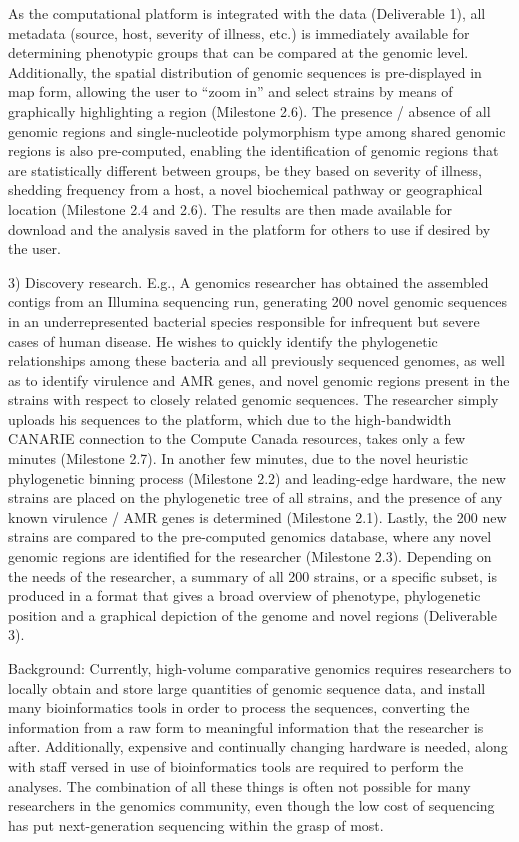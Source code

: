 \documentclass[letterpaper,12pt]{report}
\begin{document}
As the computational platform is integrated with the data (Deliverable 1), all metadata (source, host, severity of illness, etc.) is immediately available for determining phenotypic groups that can be compared at the genomic level. Additionally, the spatial distribution of genomic sequences is pre-displayed in map form, allowing the user to “zoom in” and select strains by means of graphically highlighting a region (Milestone 2.6). The presence / absence of all genomic regions and single-nucleotide polymorphism type among shared genomic regions is also pre-computed, enabling the identification of genomic regions that are statistically different between groups, be they based on severity of illness, shedding frequency from a host, a novel biochemical pathway or geographical location (Milestone 2.4 and 2.6). The results are then made available for download and the analysis saved in the platform for others to use if desired by the user.

 
3) Discovery research. E.g., A genomics researcher has obtained the assembled contigs from an Illumina sequencing run, generating 200 novel genomic sequences in an underrepresented bacterial species responsible for infrequent but severe cases of human disease. He wishes to quickly identify the phylogenetic relationships among these bacteria and all previously sequenced genomes, as well as to identify virulence and AMR genes, and novel genomic regions present in the strains with respect to closely related genomic sequences. The researcher simply uploads his sequences to the platform, which due to the high-bandwidth CANARIE connection to the Compute Canada resources, takes only a few minutes (Milestone 2.7). In another few minutes, due to the novel heuristic phylogenetic binning process (Milestone 2.2) and leading-edge hardware, the new strains are placed on the phylogenetic tree of all strains, and the presence of any known virulence / AMR genes is determined (Milestone 2.1). Lastly, the 200 new strains are compared to the pre-computed genomics database, where any novel genomic regions are identified for the researcher (Milestone 2.3). Depending on the needs of the researcher, a summary of all 200 strains, or a specific subset, is produced in a format that gives a broad overview of phenotype, phylogenetic position and a graphical depiction of the genome and novel regions (Deliverable 3).

Background: Currently, high-volume comparative genomics requires researchers to locally obtain and store large quantities of genomic sequence data, and install many bioinformatics tools in order to process the sequences, converting the information from a raw form to meaningful information that the researcher is after. Additionally, expensive and continually changing hardware is needed, along with staff versed in use of bioinformatics tools are required to perform the analyses. The combination of all these things is often not possible for many researchers in the genomics community, even though the low cost of sequencing has put next-generation sequencing within the grasp of most.
\end{document}
